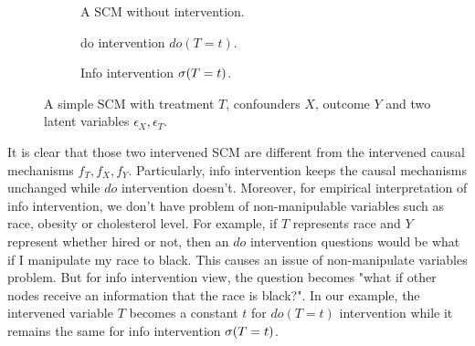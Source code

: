 \begin{figure}[ht]
	\begin{subfigure}[tb]{1.0\textwidth}
		\centering
		\caption{A SCM without intervention.}
		\label{fig:SCM1}
	\end{subfigure}
	\vfill
	\begin{subfigure}[tb]{0.5\textwidth}
		\centering
		\caption{do intervention $do(T=t)$.}
		\label{fig:SCM2}
	\end{subfigure}
	\begin{subfigure}[tb]{0.5\textwidth}
		\centering
		\caption{Info intervention $\mathrm{\sigma}(T=t)$.}
		\label{fig:SCM3}
	\end{subfigure}
	\caption{A simple SCM with treatment $T$, confounders $X$, outcome $Y$ and two latent variables $\epsilon_X, \epsilon_T$. }
	\label{fig:info-VS-$do$}
\end{figure}

It is clear that those two intervened SCM are different from the intervened causal mechanisms $f_T, f_X, f_Y$. Particularly, info intervention keeps the causal mechanisms unchanged while $do$ intervention doesn't. Moreover, for empirical interpretation of info intervention, we don't have problem of non-manipulable variables such as race, obesity or cholesterol level. For example, if $T$ represents race and $Y$ represent whether hired or not, then an $do$ intervention questions would be what if I manipulate my race to black. This causes an issue of non-manipulate variables problem. But for info intervention view, the question becomes "what if other nodes receive an information that the race is black?".  In our example, the intervened variable $T$ becomes a constant $t$ for $do(T=t)$ intervention while it remains the same for info intervention $\mathrm{\sigma}(T=t)$. 


